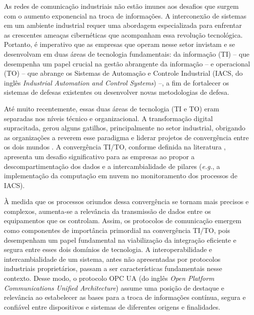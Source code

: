     As redes de comunicação industriais não estão imunes aos desafios que surgem com o aumento exponencial na troca de informações. A interconexão de sistemas em um ambiente industrial requer uma abordagem especializada para enfrentar as crescentes ameaças cibernéticas que acompanham essa revolução tecnológica. Portanto, é imperativo que as empresas que operam nesse setor invistam e se desenvolvam em duas áreas de tecnologia fundamentais: da informação (TI) --  que desempenha um papel crucial na gestão abrangente da informação -- e operacional (TO) -- que abrange os Sistemas de Automação e Controle Industrial (IACS, do inglês \textit{Industrial Automation and Control Systems}) --, a fim de fortalecer os sistemas de defesas existentes ou desenvolver novas metodologias de defesa.
    
    Até muito recentemente, essas duas áreas de tecnologia (TI e TO) eram separadas nos níveis técnico e organizacional. A transformação digital supracitada, gerou alguns gatilhos, principalmente no setor industrial, obrigando as organizações a reverem esse paradigma e liderar projetos de convergência entre os dois mundos \cite{yassine2021}. A convergência TI/TO, conforme definida na literatura \cite{yassine2021,tian2019,garimella2018}, apresenta um desafio significativo para as empresas ao propor a descompartimentação dos dados e a intercambialidade de pilares (\textit{e.g.}, a implementação da computação em nuvem no monitoramento dos processos de IACS).

    À medida que os processos oriundos dessa convergência se tornam mais precisos e complexos, aumenta-se a relevância da transmissão de dados entre os equipamentos que os controlam. Assim, os protocolos de comunicação emergem como componentes de importância primordial na convergência TI/TO, pois desempenham um papel fundamental na viabilização da integração eficiente e segura entre esses dois domínios de tecnologia. A interoperabilidade e intercambialidade de um sistema, antes não apresentadas por protocolos industriais proprietários, passam a ser características fundamentais nesse contexto. Desse modo, o protocolo OPC UA (do inglês \textit{Open Platform Communications Unified Architecture}) assume uma posição de destaque e relevância ao estabelecer as bases para a troca de informações contínua, segura e confiável entre dispositivos e sistemas de diferentes origens e finalidades.

